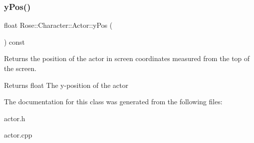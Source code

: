\subsubsection{\texorpdfstring{yPos()}{yPos()}}
{\footnotesize\ttfamily float Rose\+::\+Character\+::\+Actor\+::y\+Pos (\begin{DoxyParamCaption}{ }\end{DoxyParamCaption}) const\hspace{0.3cm}{\ttfamily [virtual]}}



Returns the position of the actor in screen coordinates measured from the top of the screen. 

\begin{DoxyReturn}{Returns}
float The y-\/position of the actor 
\end{DoxyReturn}


The documentation for this class was generated from the following files\+:\begin{DoxyCompactItemize}
\item 
actor.\+h\item 
actor.\+cpp\end{DoxyCompactItemize}
